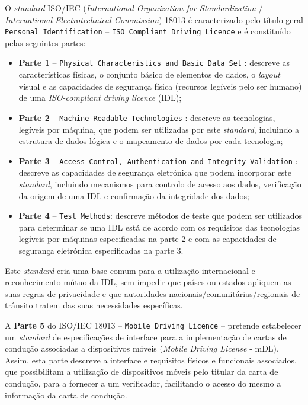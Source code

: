 
O \textit{standard} ISO/IEC (\textit{International Organization for Standardization} / \textit{International Electrotechnical Commission}) 18013 é caracterizado pelo título geral \texttt{Personal Identification} -- \texttt{ISO
Compliant Driving Licence} e é constituído pelas seguintes partes:

\begin{itemize}
	\item \textbf{Parte 1} -- \texttt{Physical Characteristics and Basic Data Set} \cite{iso_1}: descreve as características físicas, o conjunto básico de elementos de dados, o \textit{layout} visual e as capacidades de segurança física (recursos legíveis pelo ser humano) de uma \textit{ISO-compliant driving licence} (IDL);
	\item \textbf{Parte 2} -- \texttt{Machine-Readable Technologies} \cite{iso_2}: descreve as tecnologias, legíveis por máquina, que podem ser utilizadas por este \textit{standard}, incluindo a estrutura de dados lógica e o mapeamento de dados por cada tecnologia;
	\item \textbf{Parte 3} -- \texttt{Access Control, Authentication and Integrity Validation} \cite{iso_3}: descreve as capacidades de segurança eletrónica que podem incorporar este \textit{standard}, incluindo mecanismos para controlo de acesso aos dados, verificação da origem de uma IDL e confirmação da integridade dos dados;
	\item \textbf{Parte 4} -- \texttt{Test Methods}: descreve métodos de teste que podem ser utilizados para determinar se uma IDL está de acordo com os requisitos das tecnologias legíveis por máquinas especificadas na parte 2 e com as capacidades de segurança eletrónica especificadas na parte 3.
\end{itemize}

Este \textit{standard} cria uma base comum para a utilização internacional e reconhecimento mútuo da IDL, sem impedir que países ou estados apliquem as suas regras de privacidade e que autoridades nacionais/comunitárias/regionais de trânsito tratem das suas necessidades específicas.

A \textbf{Parte 5} do ISO/IEC 18013 -- \texttt{Mobile Driving Licence} \cite{iso_5} -- pretende estabelecer um \textit{standard} de especificações de interface para a implementação de cartas de condução associadas a dispositivos móveis (\textit{Mobile Driving License} - mDL). Assim, esta parte descreve a interface e requisitos físicos e funcionais associados, que possibilitam a utilização de dispositivos móveis pelo titular da carta de condução, para a fornecer a um verificador, facilitando o acesso do mesmo a informação da carta de condução.

